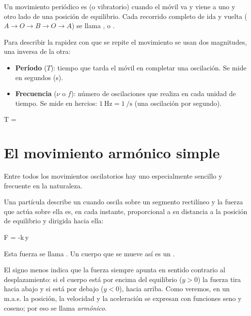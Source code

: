 \begin{definition}
    Un movimiento periódico es  (o vibratorio) cuando el móvil va y viene a uno y otro lado de una posición
    de equilibrio. Cada recorrido completo de ida y vuelta (\(A \rightarrow O \rightarrow B \rightarrow O \rightarrow A\))
    se llama ,  o .
\end{definition}

Para describir la rapidez con que se repite el movimiento se usan dos magnitudes, una inversa de la otra:
\begin{itemize}
    \item \textbf{Período} (\(T\)): tiempo que tarda el móvil en completar una oscilación. Se mide en segundos (\unit{\second}).
    \item \textbf{Frecuencia} (\(\nu\) o \(f\)): número de oscilaciones que realiza en cada unidad de tiempo. Se mide en hercios:
    \(\qty{1}{\hertz} = \qty{1}{\per\second}\) (una oscilación por segundo).
\end{itemize}
\begin{centeredequation}
    T =  \label{eq:mas-T-nu}
\end{centeredequation}

\section{El movimiento armónico simple}\label{sec:mas-definicion}

Entre todos los movimientos oscilatorios hay uno especialmente sencillo y frecuente en la naturaleza.

\begin{definition}
    Una partícula describe un  cuando oscila sobre un segmento rectilíneo y la fuerza que
    actúa sobre ella es, en cada instante, proporcional a su distancia a la posición de equilibrio y dirigida hacia ella:
    \begin{centeredequation}
        F = -k\,y \label{eq:mas-fuerza}
    \end{centeredequation}
    Esta fuerza se llama . Un cuerpo que se mueve así es un .
\end{definition}

El signo menos indica que la fuerza siempre apunta en sentido contrario al desplazamiento: si el cuerpo está por encima del
equilibrio (\(y > 0\)) la fuerza tira hacia abajo y si está por debajo (\(y < 0\)), hacia arriba. Como veremos, en un m.a.s. la
posición, la velocidad y la aceleración se expresan con funciones seno y coseno; por eso se llama \emph{armónico}.

